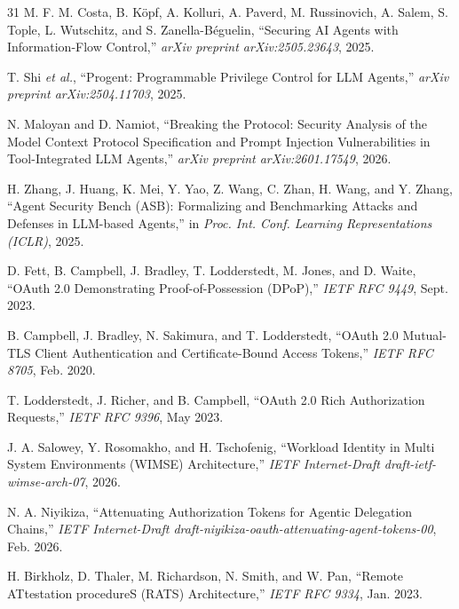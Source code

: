\documentclass[conference,10pt]{IEEEtran}
\begin{document}
\begin{thebibliography}{31}
M. F. M. Costa, B. K{\"o}pf, A. Kolluri, A. Paverd, M. Russinovich, A. Salem, S. Tople, L. Wutschitz, and S. Zanella-B{\'e}guelin, ``Securing AI Agents with Information-Flow Control,'' \emph{arXiv preprint arXiv:2505.23643}, 2025.

T. Shi \emph{et al.}, ``Progent: Programmable Privilege Control for LLM Agents,'' \emph{arXiv preprint arXiv:2504.11703}, 2025.

N. Maloyan and D. Namiot, ``Breaking the Protocol: Security Analysis of the Model Context Protocol Specification and Prompt Injection Vulnerabilities in Tool-Integrated LLM Agents,'' \emph{arXiv preprint arXiv:2601.17549}, 2026.

H. Zhang, J. Huang, K. Mei, Y. Yao, Z. Wang, C. Zhan, H. Wang, and Y. Zhang, ``Agent Security Bench (ASB): Formalizing and Benchmarking Attacks and Defenses in LLM-based Agents,'' in \emph{Proc. Int. Conf. Learning Representations (ICLR)}, 2025.

D. Fett, B. Campbell, J. Bradley, T. Lodderstedt, M. Jones, and D. Waite, ``OAuth 2.0 Demonstrating Proof-of-Possession (DPoP),'' \emph{IETF RFC 9449}, Sept. 2023.

B. Campbell, J. Bradley, N. Sakimura, and T. Lodderstedt, ``OAuth 2.0 Mutual-TLS Client Authentication and Certificate-Bound Access Tokens,'' \emph{IETF RFC 8705}, Feb. 2020.

T. Lodderstedt, J. Richer, and B. Campbell, ``OAuth 2.0 Rich Authorization Requests,'' \emph{IETF RFC 9396}, May 2023.

J. A. Salowey, Y. Rosomakho, and H. Tschofenig, ``Workload Identity in Multi System Environments (WIMSE) Architecture,'' \emph{IETF Internet-Draft draft-ietf-wimse-arch-07}, 2026.

N. A. Niyikiza, ``Attenuating Authorization Tokens for Agentic Delegation Chains,'' \emph{IETF Internet-Draft draft-niyikiza-oauth-attenuating-agent-tokens-00}, Feb. 2026.

H. Birkholz, D. Thaler, M. Richardson, N. Smith, and W. Pan, ``Remote ATtestation procedureS (RATS) Architecture,'' \emph{IETF RFC 9334}, Jan. 2023.
\end{thebibliography}
\end{document}
